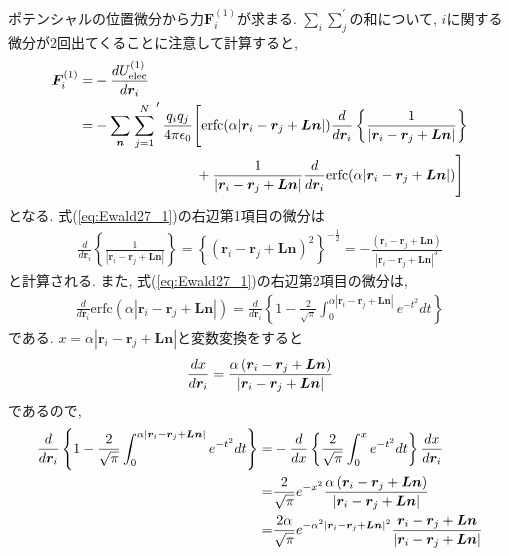 ポテンシャルの位置微分から力$\bm{F}_{i}^{(1)}$が求まる.
$\sum_{i}\sum_{j}^{'}$の和について, $i$に関する微分が2回出てくることに注意して計算すると,
\begin{align}
   \bm{F}_{i}^{(1)}
 =&
   -\frac{d U_{\mathrm{elec}}^{(1)}}{d \bm{r}_{i}}
 \notag
 \\
 =&
   -\sum_{\bm{n}} \left.\sum_{j=1}^{N}\right.^{\prime}
 \frac{q_{i} q_{j}}{4 \pi \epsilon_{0}}
 \Bigg[
        \mathrm{erfc}(\alpha |\bm{r}_{i} - \bm{r}_{j} + \bm{Ln}|)
        \frac{d}{d \bm{r}_{i}}
        \left\{
                \frac{1}{|\bm{r}_{i} - \bm{r}_{j} + \bm{Ln}|}
        \right\}
 \notag
 \\
 &~~~~~~~~~~~~~~~~~~~~~~+
        \frac{1}{|\bm{r}_{i} - \bm{r}_{j} + \bm{Ln}|}
        \frac{d}{d \bm{r}_{i}}
        \mathrm{erfc}(\alpha |\bm{r}_{i} - \bm{r}_{j} + \bm{Ln}|)
  \Bigg]
 \label{eq:Ewald27_1}
\end{align}
となる. 式(\ref{eq:Ewald27_1})の右辺第1項目の微分は
\begin{align}
   \frac{d}{d \bm{r}_{i}}
   \left\{
          \frac{1}{|\bm{r}_{i} - \bm{r}_{j} + \bm{Ln}|}
   \right\}
 =
   \left\{
          \left(\bm{r}_{i} - \bm{r}_{j} + \bm{Ln}\right)^{2}
   \right\}^{-\frac{1}{2}}
 =
   -\frac{\left(\bm{r}_{i} - \bm{r}_{j} + \bm{Ln}\right)}
         {|\bm{r}_{i} - \bm{r}_{j} + \bm{Ln}|^{3}}
\end{align}
と計算される. また, 式(\ref{eq:Ewald27_1})の右辺第2項目の微分は,
\begin{align}
  \frac{d}{d \bm{r}_{i}}
  \mathrm{erfc}(\alpha |\bm{r}_{i} - \bm{r}_{j} + \bm{Ln}|)
 =
  \frac{d}{d \bm{r}_{i}}
  \left\{
         1 - \frac{2}{\sqrt{\pi}}
         \int_{0}^{\alpha |\bm{r}_{i} - \bm{r}_{j} + \bm{Ln}|}
         e^{-t^{2}} dt
 \right\}
\end{align}
である. $x=\alpha |\bm{r}_{i} - \bm{r}_{j} + \bm{Ln}|$と変数変換をすると
\begin{equation}
 \frac{d x}{d \bm{r}_{i}}
  = \frac{\alpha \left(\bm{r}_{i} - \bm{r}_{j} + \bm{Ln}\right)}
         {|\bm{r}_{i} - \bm{r}_{j} + \bm{Ln}|}
  \notag
\end{equation}
であるので,
\begin{align}
    \frac{d}{d \bm{r}_{i}}
    \left\{
           1 - \frac{2}{\sqrt{\pi}}
           \int_{0}^{\alpha |\bm{r}_{i} - \bm{r}_{j} + \bm{Ln}|}
           e^{-t^{2}} dt
 \right\}
 =&
   -\frac{d}{d x}
    \left\{
           \frac{2}{\sqrt{\pi}}
           \int_{0}^{x} e^{-t^{2}} dt
   \right\}
   \frac{d x}{d \bm{r}_{i}}
 \notag
 \\
 =&
   \frac{2}{\sqrt{\pi}} e^{-x^{2}}
   \frac{\alpha \left(\bm{r}_{i} - \bm{r}_{j} + \bm{Ln}\right)}
        {|\bm{r}_{i} - \bm{r}_{j} + \bm{Ln}|}
 \notag
 \\
 =&
   \frac{2\alpha}{\sqrt{\pi}}
   e^{-\alpha^{2} |\bm{r}_{i} - \bm{r}_{j} + \bm{Ln}|^{2}}
   \frac{\bm{r}_{i} - \bm{r}_{j} + \bm{Ln}}
        {|\bm{r}_{i} - \bm{r}_{j} + \bm{Ln}|}
 \notag
\end{align}
